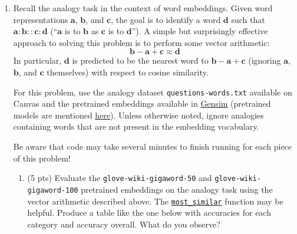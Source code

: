 \documentclass{article}
\begin{document}
\begin{enumerate}
    \item Recall the analogy task in the context of word embeddings. Given word representations $\mathbf{a}$, $\mathbf{b}$, and $\mathbf{c}$, the goal is to identify a word $\mathbf{d}$ such that $\mathbf{a}:\mathbf{b}::\mathbf{c}:\mathbf{d}$ (``$\mathbf{a}$ is to $\mathbf{b}$ as $\mathbf{c}$ is to $\mathbf{d}$''). A simple but surprisingly effective approach to solving this problem is to perform some vector arithmetic:
    \[\mathbf{b} - \mathbf{a} + \mathbf{c} \approx \mathbf{d}\]
    In particular, $\mathbf{d}$ is predicted to be the nearest word to $\mathbf{b} - \mathbf{a} + \mathbf{c}$ (ignoring $\mathbf{a}$, $\mathbf{b}$, and $\mathbf{c}$ themselves) with respect to cosine similarity.

    For this problem, use the analogy dataset \texttt{questions-words.txt} available on Canvas and the pretrained embeddings available in \href{https://radimrehurek.com/gensim/}{Gensim} (pretrained models are mentioned \href{https://radimrehurek.com/gensim/models/word2vec.html}{here}). Unless otherwise noted, ignore analogies containing words that are not present in the embedding vocabulary.

    Be aware that code may take several minutes to finish running for each piece of this problem!
    \begin{enumerate}
        \item (5 pts) Evaluate the \texttt{glove-wiki-gigaword-50} and \texttt{glove-wiki-gigaword-100} pretrained embeddings on the analogy task using the vector arithmetic described above. The \href{https://tedboy.github.io/nlps/generated/generated/gensim.models.Word2Vec.most_similar.html}{\texttt{most\_similar}} function may be helpful. Produce a table like the one below with accuracies for each category and accuracy overall. What do you observe?
        

\end{enumerate}
\end{enumerate}
\end{document}

